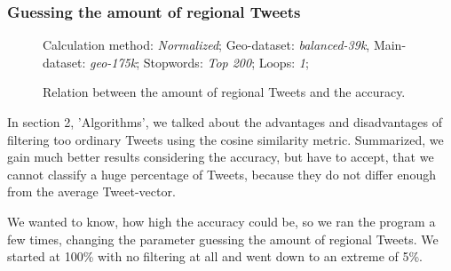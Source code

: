 \documentclass[../Main.tex]{subfiles}
\begin{document}
\subsubsection{Guessing the amount of regional Tweets}
 \label{geo_guessing}
\begin{figure}
Calculation method: \textit{Normalized}; Geo-dataset: \textit{balanced-39k}, Main-dataset: \textit{geo-175k}; Stopwords: \textit{Top 200}; Loops: \textit{1}; 

  \caption{Relation between the amount of regional Tweets and the accuracy.}
  \label{geo_graph2}
\end{figure}
In section 2, 'Algorithms', we talked about the advantages and disadvantages of filtering too ordinary Tweets using the cosine similarity metric. Summarized, we gain much better results considering the accuracy, but have to accept, that we cannot classify a huge percentage of Tweets, because they do not differ enough from the average Tweet-vector.

We wanted to know, how high the accuracy could be, so we ran the program a few times, changing the parameter guessing the amount of regional Tweets. We started at 100\% with no filtering at all and went down to an extreme of 5\%.
\end{document}
